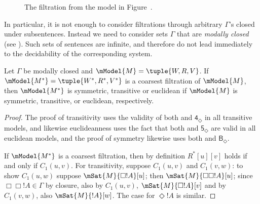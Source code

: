 \documentclass[../../../include/open-logic-section]{subfiles}
\begin{document}
\begin{figure}[ht]
  \centering
  \caption{The filtration from the model in Figure~.}
\end{figure}

In particular, it is not enough to consider filtrations through
arbitrary $\Gamma$'s closed under subsentences. Instead we need to
consider sets $\Gamma$ that are \emph{modally closed} (see
). Such sets of sentences are
infinite, and therefore do not lead immediately to the decidability of
the corresponding system.

\begin{thm}
  Let $\Gamma$ be modally closed and $\mModel{M}=\tuple{W,R,V}$. If
  $\mModel{M^*} = \tuple{W^*,R^*,V^*}$ is a coarsest filtration of
  $\mModel{M}$, then $\mModel{M^*}$ is symmetric, transitive or
  euclidean if $\mModel{M}$ is symmetric, transitive, or euclidean,
  respectively.
\end{thm}

\begin{proof}
  The proof of transitivity uses the validity of both  and
  $\mathsf{4_\Diamond}$ in all transitive models, and likewise
  euclideanness uses the fact that both  and
  $\mathsf{5_\Diamond}$ are valid in all euclidean models, and the
  proof of symmetry likewise uses both  and
  $\mathsf{B_\Diamond}$.

  If $\mModel{M^*}$ is a coarsest filtration, then by definition
  $R^*[u][v]$ holds if and only if $C_1(u,v)$. For transitivity,
  suppose $C_1(u,v)$ and $C_1(v,w)$: to show $C_1(u,w)$ suppose
  $\mSat{M}{\Box !A}[u]$; then $\mSat{M}{\Box\Box!A}[u]$; since
  $\Box\Box!A \in \Gamma$ by closure, also by $C_1(u,v)$,
  $\mSat{M}{\Box!A}[v]$ and by $C_1(v,w)$, also $\mSat{M}{!A}[w]$. The
  case for $\Diamond!A$ is similar.
\end{proof}
\end{document}

